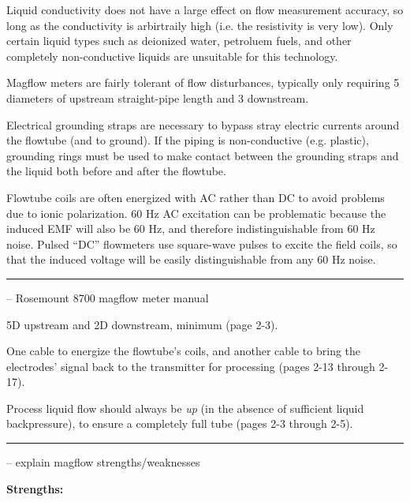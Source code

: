 Liquid conductivity does not have a large effect on flow measurement accuracy, so long as the conductivity is arbirtraily high (i.e. the resistivity is very low).  Only certain liquid types such as deionized water, petroluem fuels, and other completely non-conductive liquids are unsuitable for this technology.

\vskip 10pt

Magflow meters are fairly tolerant of flow disturbances, typically only requiring 5 diameters of upstream straight-pipe length and 3 downstream.

\vskip 10pt

Electrical grounding straps are necessary to bypass stray electric currents around the flowtube (and to ground).  If the piping is non-conductive (e.g. plastic), grounding rings must be used to make contact between the grounding straps and the liquid both before and after the flowtube.

\vskip 10pt

Flowtube coils are often energized with AC rather than DC to avoid problems due to ionic polarization.  60 Hz AC excitation can be problematic because the induced EMF will also be 60 Hz, and therefore indistinguishable from 60 Hz noise.  Pulsed ``DC'' flowmeters use square-wave pulses to excite the field coils, so that the induced voltage will be easily distinguishable from any 60 Hz noise.


\filbreak \vskip 5pt \hrule \vskip 5pt  -- Rosemount 8700 magflow meter manual \vskip 10pt

5D upstream and 2D downstream, minimum (page 2-3).

\vskip 10pt

One cable to energize the flowtube's coils, and another cable to bring the electrodes' signal back to the transmitter for processing (pages 2-13 through 2-17).

\vskip 10pt

Process liquid flow should always be {\it up} (in the absence of sufficient liquid backpressure), to ensure a completely full tube (pages 2-3 through 2-5).


\filbreak \vskip 5pt \hrule \vskip 5pt  -- explain magflow strengths/weaknesses \vskip 10pt

{\bf Strengths:}

